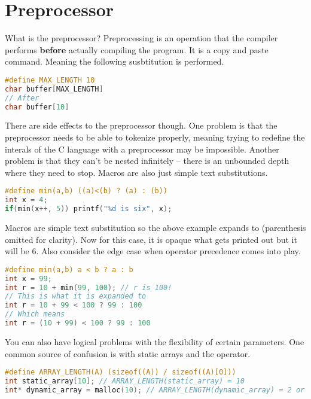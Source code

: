 \section{Preprocessor}

What is the preprocessor? Preprocessing is an operation that the compiler performs \textbf{before} actually compiling the program. It is a copy and paste command. Meaning the following susbtitution is performed.

\begin{lstlisting}[language=C]
#define MAX_LENGTH 10
char buffer[MAX_LENGTH]
// After
char buffer[10]
\end{lstlisting}

There are side effects to the preprocessor though. One problem is that the preprocessor needs to be able to tokenize properly, meaning trying to redefine the interals of the C language with a preprocessor may be impossible. Another problem is that they can't be nested infinitely -- there is an unbounded depth where they need to stop. Macros are also just simple text substitutions.

\begin{lstlisting}[language=C]
#define min(a,b) ((a)<(b) ? (a) : (b))
int x = 4;
if(min(x++, 5)) printf("%d is six", x);
\end{lstlisting}

Macros are simple text substitution so the above example expands to  (parenthesis omitted for clarity). Now for this case, it is opaque what gets printed out but it will be 6. Also consider the edge case when operator precedence comes into play.

\begin{lstlisting}[language=C]
#define min(a,b) a < b ? a : b
int x = 99;
int r = 10 + min(99, 100); // r is 100!
// This is what it is expanded to
int r = 10 + 99 < 100 ? 99 : 100
// Which means
int r = (10 + 99) < 100 ? 99 : 100
\end{lstlisting}

You can also have logical problems with the flexibility of certain parameters. One common source of confusion is with static arrays and the  operator.

\begin{lstlisting}[language=C]
#define ARRAY_LENGTH(A) (sizeof((A)) / sizeof((A)[0]))
int static_array[10]; // ARRAY_LENGTH(static_array) = 10
int* dynamic_array = malloc(10); // ARRAY_LENGTH(dynamic_array) = 2 or 1
\end{lstlisting}

